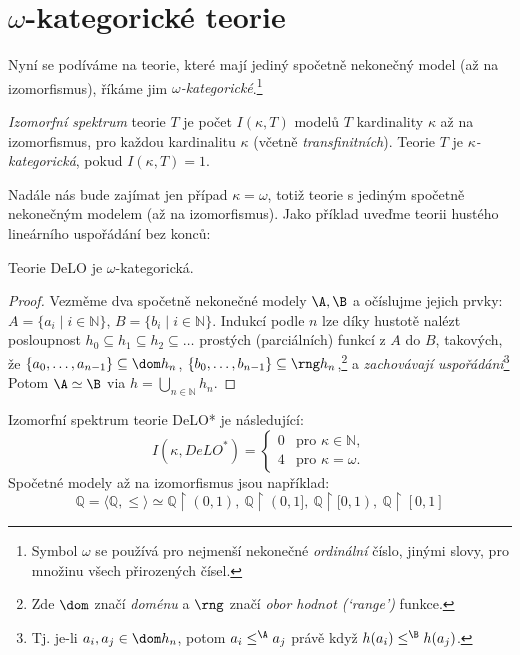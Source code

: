 \section{$\omega$-kategorické teorie}\label{section:categoricity}

Nyní se podíváme na teorie, které mají jediný spočetně nekonečný model (až na izomorfismus), říkáme jim \emph{$\omega$-kategorické}.\footnote{Symbol $\omega$ se používá pro nejmenší nekonečné \emph{ordinální} číslo, jinými slovy, pro množinu všech přirozených čísel.}

\begin{definition}
    \emph{Izomorfní spektrum} teorie $T$ je počet $
    I(\kappa,T)$ modelů $T$ kardinality $\kappa$ až na izomorfismus, pro každou kardinalitu $\kappa$ (včetně \emph{transfinitních}).     Teorie $T$ je \emph{$\kappa$-kategorická}, pokud $
    I(\kappa,T)=1$.
\end{definition}

Nadále nás bude zajímat jen případ $\kappa=\omega$, totiž teorie s jediným spočetně nekonečným modelem (až na izomorfismus). Jako příklad uveďme teorii hustého lineárního uspořádání bez konců:

\begin{proposition}
    Teorie DeLO je $\omega$-kategorická.
\end{proposition}
\begin{proof}
Vezměme dva spočetně nekonečné modely $\A,\B$ a očíslujme jejich prvky: $A=\{a_i\mid i\in\mathbb N\}$, $B=\{b_i\mid i\in\mathbb N\}$. Indukcí podle $n$ lze díky hustotě nalézt posloupnost $h_0\subseteq h_1\subseteq h_2\subseteq\dots$ prostých (parciálních) funkcí z $A$ do $B$, takových, že $\{a_0,\dots,a_{n-1}\}\subseteq\dom h_n$, $\{b_0,\dots,b_{n-1}\}\subseteq\rng h_n$,\footnote{Zde $\dom$ značí \emph{doménu} a $\rng$ značí \emph{obor hodnot (`range')} funkce.} a \emph{zachovávají uspořádání}\footnote{Tj. je-li $a_i,a_j\in\dom h_n$, potom $a_i\leq^\A a_j$ právě když $h(a_i)\leq^\B h(a_j)$.} Potom $\A\simeq\B$ via $h=\bigcup_{n\in\mathbb N}h_n$.
\end{proof}

\begin{corollary}
Izomorfní spektrum teorie DeLO* je následující:
$$
I(\kappa,DeLO^*)=\begin{cases}
    0 &\text{pro }\kappa\in\mathbb{N},\\
    4 &\text{pro }\kappa=\omega.
\end{cases}
$$
Spočetné modely až na izomorfismus jsou například:
$$ 
\mathbb Q=\langle \mathbb Q,\leq\rangle\simeq\mathbb Q\upharpoonright(0,1), \ \mathbb Q\upharpoonright(0,1], \ \mathbb Q \upharpoonright [0,1), \ \mathbb Q \upharpoonright [0,1]
$$
\end{corollary}


